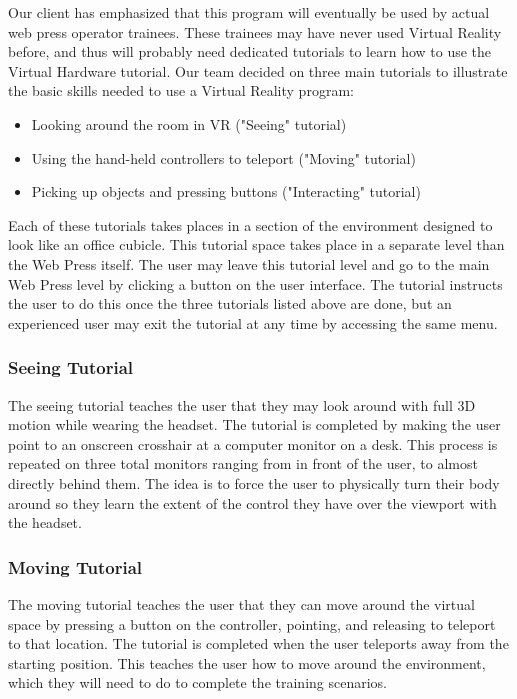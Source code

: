 \documentclass[onecolumn, draftclsnofoot,10pt, compsoc]{IEEEtran}
\begin{document}
Our client has emphasized that this program will eventually be used by actual web press operator trainees. These trainees may have never used Virtual Reality before, and thus will probably need dedicated tutorials to learn how to use the Virtual Hardware tutorial. Our team decided on three main tutorials to illustrate the basic skills needed to use a Virtual Reality program:

\begin{itemize}
    \item Looking around the room in VR ("Seeing" tutorial)
    \item Using the hand-held controllers to teleport ("Moving" tutorial)
    \item Picking up objects and pressing buttons ("Interacting" tutorial)
\end{itemize}

Each of these tutorials takes places in a section of the environment designed to look like an office cubicle. This tutorial space takes place in a separate level than the Web Press itself. The user may leave this tutorial level and go to the main Web Press level by clicking a button on the user interface. The tutorial instructs the user to do this once the three tutorials listed above are done, but an experienced user may exit the tutorial at any time by accessing the same menu.

\subsubsection{Seeing Tutorial}

The seeing tutorial teaches the user that they may look around with full 3D motion while wearing the headset. The tutorial is completed by making the user point to an onscreen crosshair at a computer monitor on a desk. This process is repeated on three total monitors ranging from in front of the user, to almost directly behind them. The idea is to force the user to physically turn their body around so they learn the extent of the control they have over the viewport with the headset.



\subsubsection{Moving Tutorial}
The moving tutorial teaches the user that they can move around the virtual space by pressing a button on the controller, pointing, and releasing to teleport to that location. The tutorial is completed when the user teleports away from the starting position. This teaches the user how to move around the environment, which they will need to do to complete the training scenarios.   
\end{document}
